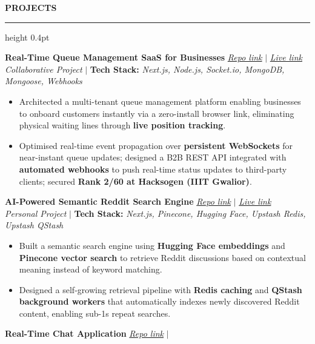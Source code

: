 \documentclass[a4paper,10pt]{article}
\newcommand{\ressection}[1]{%
  \vspace{8pt}%
  {\large\bfseries #1}\par%
  \kern 5pt%
  \hrule height 0.4pt%
  \vspace{4pt}%
}
\begin{document}
\ressection{PROJECTS}
\vspace{2pt}
\noindent\textbf{Real-Time Queue Management SaaS for Businesses} \hfill
\href{https://github.com/VaishnavAmbilpur/FLOW-Q_Binary_Builders}{\textit{Repo link}} $|$
\href{https://flow-q-binary-builders.vercel.app/}{\textit{Live link}} \\[2pt]
\noindent\textit{Collaborative Project} $|$ {\small \textbf{Tech Stack:} \textit{Next.js, Node.js, Socket.io, MongoDB, Mongoose, Webhooks}}
\begin{itemize}[label={--}, leftmargin=15pt, itemsep=2pt, topsep=2pt]
\item Architected a multi-tenant queue management platform enabling businesses to onboard customers instantly via a zero-install browser link, eliminating physical waiting lines through \textbf{live position tracking}.
\item Optimised real-time event propagation over \textbf{persistent WebSockets} for near-instant queue updates; designed a B2B REST API integrated with \textbf{automated webhooks} to push real-time status updates to third-party clients; secured \textbf{Rank 2/60 at Hacksogen (IIIT Gwalior)}.
\end{itemize}
\vspace{5pt}
\noindent\textbf{AI-Powered Semantic Reddit Search Engine} \hfill
\href{https://github.com/VaishnavAmbilpur/semantic-reddit-search}{\textit{Repo link}} $|$
\href{https://semantic-reddit-search.vercel.app/}{\textit{Live link}} \\[2pt]
\noindent\textit{Personal Project} $|$ {\small \textbf{Tech Stack:} \textit{Next.js, Pinecone, Hugging Face, Upstash Redis, Upstash QStash}}
\begin{itemize}[label={--}, leftmargin=15pt, itemsep=2pt, topsep=2pt]
\item Built a semantic search engine using \textbf{Hugging Face embeddings} and \textbf{Pinecone vector search} to retrieve Reddit discussions based on contextual meaning instead of keyword matching.
\item Designed a self-growing retrieval pipeline with \textbf{Redis caching} and \textbf{QStash background workers} that automatically indexes newly discovered Reddit content, enabling sub-1s repeat searches.
\end{itemize}
\vspace{5pt}
\noindent\textbf{Real-Time Chat Application} \hfill
\href{https://github.com/VaishnavAmbilpur/Chatty}{\textit{Repo link}} $|$
\end{document}
